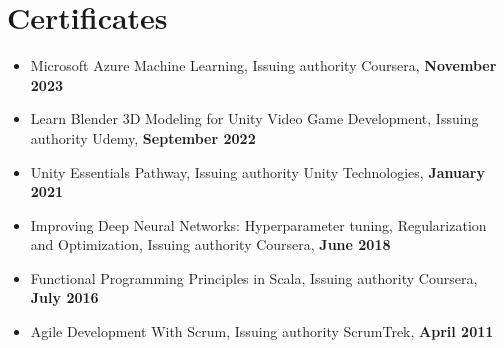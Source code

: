 \section*{Certificates}

\begin{itemize}[noitemsep, nosep]
  \item Microsoft Azure Machine Learning, Issuing authority Coursera, \textbf{November 2023}
  \item Learn Blender 3D Modeling for Unity Video Game Development, Issuing authority Udemy, \textbf{September 2022}
  \item Unity Essentials Pathway, Issuing authority Unity Technologies, \textbf{January 2021}
  \item Improving Deep Neural Networks: Hyperparameter tuning, Regularization and Optimization, Issuing authority Coursera, \textbf{June 2018}
  \item Functional Programming Principles in Scala, Issuing authority Coursera, \textbf{July 2016}
  \item Agile Development With Scrum, Issuing authority ScrumTrek, \textbf{April 2011}
\end{itemize}
